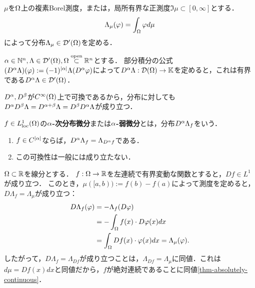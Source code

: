 \documentclass[uplatex,dvipdfmx]{jsreport}
\begin{document}
\begin{example}[測度は分布]
    $\mu$を$\Omega$上の複素Borel測度，または，局所有界な正測度$\Im\mu\subset[0,\infty]$とする．
    \[\Lambda_\mu(\varphi)=\int_\Omega\varphi d\mu\]
    によって分布$\Lambda_\mu\in\mathcal{D}'(\Omega)$を定める．
\end{example}

\begin{definition}
    $\alpha\in\mathbb{N}^n,\Lambda\in\mathcal{D}'(\Omega),\Omega\overset{\mathrm{open}}{\subset}\mathbb{R}^n$とする．
    部分積分の公式$(D^\alpha\Lambda)(\varphi):=(-1)^{\lvert\alpha\rvert}\Lambda(D^\alpha\varphi)$によって$D^\alpha\Lambda:\mathcal{D}(\Omega)\to\mathbb{K}$を定めると，これは有界である$D^\alpha\Lambda\in\mathcal{D}'(\Omega)$．
\end{definition}
\begin{remark}
    $D^\alpha,D^\beta$が$C^\infty(\Omega)$上で可換であるから，分布に対しても$D^\alpha D^\beta\Lambda=D^{\alpha+\beta}\Lambda=D^\beta D^\alpha\Lambda$が成り立つ．
\end{remark}

\begin{definition}
    $f\in L^1_{\mathrm{loc}}(\Omega)$の\textbf{$\alpha$-次分布微分}または\textbf{$\alpha$-弱微分}とは，分布$D^\alpha\Lambda_f$をいう．
\end{definition}

\begin{lemma}\mbox{}
    \begin{enumerate}
        \item $f\in C^{\lvert\alpha\rvert}$ならば，$D^\alpha\Lambda_f=\Lambda_{D^\alpha f}$である．
        \item この可換性は一般には成り立たない．
    \end{enumerate}
\end{lemma}

\begin{example}
    $\Omega\subset\mathbb{R}$を線分とする．
    $f:\Omega\to\mathbb{R}$を左連続で有界変動な関数とすると，$Df\in L^1$が成り立つ．
    このとき，$\mu([a,b)):=f(b)-f(a)$によって測度を定めると，$D\Lambda_f=\Lambda_\mu$が成り立つ：
    \begin{align*}
        D\Lambda_f(\varphi)&=-\Lambda_f(D\varphi)\\
        &=-\int_\Omega f(x)\cdot D\varphi(x)dx\\
        &=\int_\Omega Df(x)\cdot\varphi(x)dx=\Lambda_\mu(\varphi).
    \end{align*}
    したがって，$D\Lambda_f=\Lambda_{Df}$が成り立つことは，$\Lambda_{Df}=\Lambda_\mu$に同値．これは$d\mu=Df(x)dx$と同値だから，$f$が絶対連続であることに同値\ref{thm-absolutely-continuous}．
\end{example}
\end{document}
